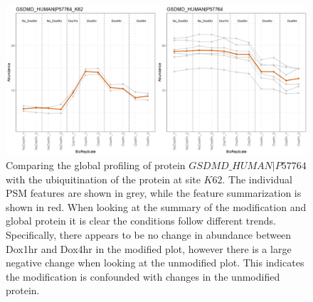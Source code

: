 \documentclass[mcp]{article}
\numberwithin{figure}{section} %
\numberwithin{table}{section}
\begin{document}
\begin{figure}[ht]
\centering
\includegraphics[width=1\textwidth]{images/IpaH_prof_plot.png}
\caption{Comparing the global profiling of protein $GSDMD\_HUMAN|P57764$ with the ubiquitination of the protein at site $K62$. The individual PSM features are shown in grey, while the feature summarization is shown in red. When looking at the summary of the modification and global protein it is clear the conditions follow different trends. Specifically, there appears to be no change in abundance between Dox1hr and Dox4hr in the modified plot, however there is a large negative change when looking at the unmodified plot. This indicates the modification is confounded with changes in the unmodified protein.
}\label{fig:ipah_profile}
\end{figure}


\end{document}
